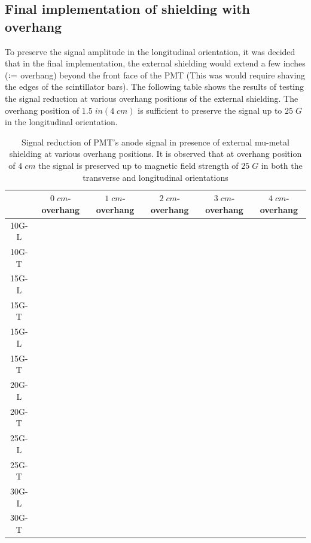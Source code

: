 \documentclass[12pt]{article}
\newcommand{\defeq}{\vcentcolon=}
\begin{document}
\subsection{Final implementation of shielding with overhang}
To preserve the signal amplitude in the longitudinal orientation, it was decided that in the final implementation, the external shielding would extend a few inches ($\defeq$ overhang) beyond the front face of the PMT (This was would require shaving the edges of the scintillator bars). The following table shows the results of testing the signal reduction at various overhang positions of the external shielding. The overhang position of $1.5\;in(4\;cm)$ is sufficient to preserve the signal up to $25\;G$ in the longitudinal orientation.

\begin{table}[H]
	\begin{center}
		\begin{tabular}{|c|c|c|c|c|c|}
			\hline
	 		& $0\;cm$-overhang & $1\;cm$-overhang & $2\;cm$-overhang & $3\;cm$-overhang & $4\;cm$-overhang \\
			\hline
 			10G-L & & & & & \\
 			10G-T & & & & & \\ 
 			\hline
 			15G-L & & & & & \\
 			15G-T & & & & & \\
 			\hline
 			15G-L & & & & & \\
 			15G-T & & & & & \\
 			\hline
 			20G-L & & & & & \\
 			20G-T & & & & & \\
 			\hline
 			25G-L & & & & & \\
 			25G-T & & & & &\\
 			\hline
 			30G-L & & & & & \\
 			30G-T & & & & & \\
 			\hline
		\end{tabular}
	\end{center}
	\caption{Signal reduction of PMT's anode signal in presence of external mu-metal shielding at various overhang positions. It is observed that at overhang position of $4\;cm$ the signal is preserved up to magnetic field strength of $25\;G$ in both the transverse and longitudinal orientations}
\end{table}
\end{document}
